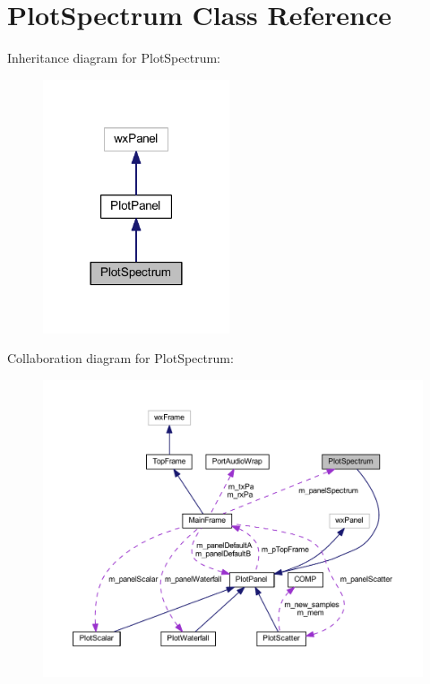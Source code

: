 \hypertarget{class_plot_spectrum}{\section{Plot\-Spectrum Class Reference}
\label{class_plot_spectrum}
}


Inheritance diagram for Plot\-Spectrum\-:\nopagebreak
\begin{figure}[H]
\begin{center}
\leavevmode
\includegraphics[width=156pt]{class_plot_spectrum__inherit__graph}
\end{center}
\end{figure}


Collaboration diagram for Plot\-Spectrum\-:\nopagebreak
\begin{figure}[H]
\begin{center}
\leavevmode
\includegraphics[width=350pt]{class_plot_spectrum__coll__graph}
\end{center}
\end{figure}
